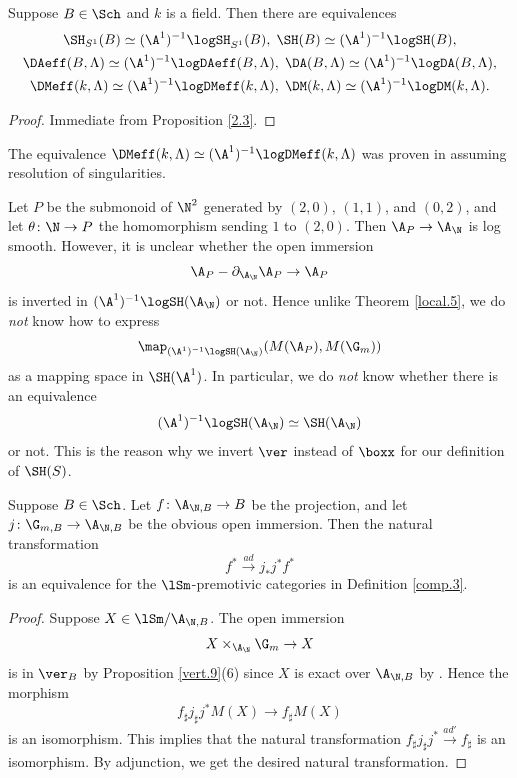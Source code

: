 \documentclass[10pt]{amsart}
\begin{document}
\begin{prop}
Suppose $B\in \Sch$ and $k$ is a field.
Then there are equivalences
\begin{gather*}
\SH_{S^1}(B)
\simeq
(\A^1)^{-1}\logSH_{S^1}(B),
\;
\SH(B)
\simeq
(\A^1)^{-1}\logSH(B),
\\
\DAeff(B,\Lambda)
\simeq
(\A^1)^{-1}\logDAeff(B,\Lambda),
\;
\DA(B,\Lambda)
\simeq
(\A^1)^{-1}\logDA(B,\Lambda),
\\
\DMeff(k,\Lambda)
\simeq
(\A^1)^{-1}\logDMeff(k,\Lambda),
\;
\DM(k,\Lambda)
\simeq
(\A^1)^{-1}\logDM(k,\Lambda).
\end{gather*}
\end{prop}
\begin{proof}
Immediate from Proposition \ref{2.3}.
\end{proof}

The equivalence $\DMeff(k,\Lambda)
\simeq
(\A^1)^{-1}\logDMeff(k,\Lambda)$ was proven in \cite[Theorem 8.2.16]{logDM} assuming resolution of singularities.


\begin{rmk}
Let $P$ be the submonoid of $\N^2$ generated by $(2,0)$, $(1,1)$, and $(0,2)$, and let $\theta \colon \N\to P$ the homomorphism sending $1$ to $(2,0)$.
Then $\A_P\to \A_{\N}$ is log smooth.
However, it is unclear whether the open immersion
\[
\A_{P}-\partial_{\A_{\N}}\A_P\to \A_P
\]
is inverted in $(\A^1)^{-1}\logSH(\A_{\N})$ or not.
Hence unlike Theorem \ref{local.5}, we do \emph{not} know how to express
\[
\map_{(\A^1)^{-1}\logSH(\A_{\N})}(M(\A_P),M(\G_m))
\]
as a mapping space in $\SH(\A^1)$.
In particular, we do \emph{not} know whether there is an equivalence
\[
(\A^1)^{-1}\logSH(\A_{\N})
\simeq
\SH(\A_{\N})
\]
or not.
This is the reason why we invert $\ver$ instead of $\boxx$ for our definition of $\SH(S)$.
\end{rmk}

\begin{prop}
\label{comp.6}
Suppose $B\in \Sch$.
Let $f\colon \A_{\N,B}\to B$ be the projection, and let $j\colon \G_{m,B} \to \A_{\N,B}$ be the obvious open immersion.
Then the natural transformation
\[
f^*\xrightarrow{ad} j_*j^* f^*
\]
is an equivalence for the $\lSm$-premotivic categories in \textup{Definition \ref{comp.3}}.
\end{prop}
\begin{proof}
Suppose $X\in \lSm/\A_{\N,B}$.
The open immersion
\[
X\times_{\A_{\N}}\G_m \to X
\]
is in $\ver_{B}$ by Proposition \ref{vert.9}(6) since $X$ is exact over $\A_{\N,B}$ by \cite[Proposition I.4.2.1(4)]{Ogu}.
Hence the morphism
\[
f_\sharp j_\sharp j^*M(X)
\to
f_\sharp M(X) 
\]
is an isomorphism.
This implies that the natural transformation $f_\sharp j_\sharp j^* \xrightarrow{ad'} f_\sharp$ is an isomorphism.
By adjunction, we get the desired natural transformation.
\end{proof}
\end{document}
